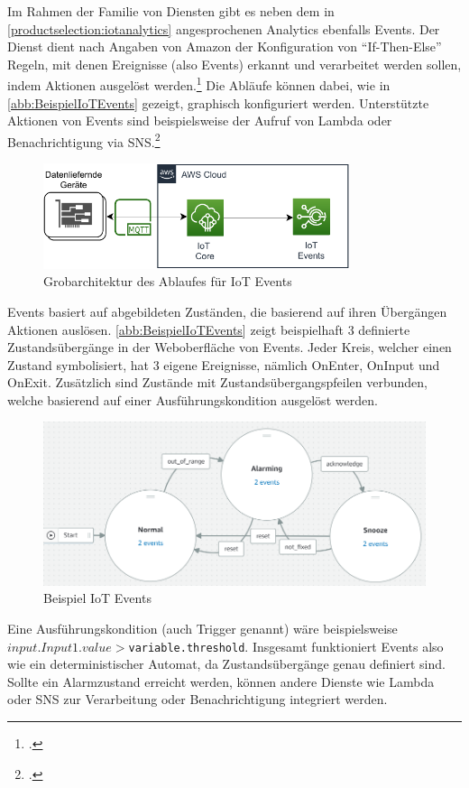 Im Rahmen der \AWSIOT{} Familie von Diensten gibt es neben dem in \autoref{productselection:iotanalytics} angesprochenen \AWSIOT{} Analytics ebenfalls \AWSIOT{} Events.  
Der Dienst dient nach Angaben von Amazon der Konfiguration von \enquote{If-Then-Else} Regeln, mit denen Ereignisse (also Events) erkannt und verarbeitet werden sollen, indem Aktionen ausgelöst werden.\footcite[Vgl.][]{AmazonWebServicesInc..o.J.b} Die Abläufe können dabei, wie in \autoref{abb:BeispielIoTEvents} gezeigt, graphisch konfiguriert werden. Unterstützte Aktionen von \AWSIOT{} Events sind beispielsweise der Aufruf von Lambda oder Benachrichtigung via \ac{SNS}.\footcite[Vgl.][]{AmazonWebServicesInc..o.J.ao}
\begin{figure}[H]
\centering
\includegraphics[width=0.8\textwidth]{graphics/IoT-Events-general.pdf}
\caption{Grobarchitektur des Ablaufes für IoT Events}
\label{abb:GrobArchitekturIoTEvents}
\end{figure}

\AWSIOT{} Events basiert auf abgebildeten Zuständen, die basierend auf ihren Übergängen Aktionen auslösen. \autoref{abb:BeispielIoTEvents} zeigt beispielhaft 3 definierte Zustandsübergänge in der Weboberfläche von \AWSIOT{} Events. Jeder Kreis, welcher einen Zustand symbolisiert, hat 3 eigene Ereignisse, nämlich OnEnter, OnInput und OnExit. Zusätzlich sind Zustände mit Zustandsübergangspfeilen verbunden, welche basierend auf einer Ausführungskondition ausgelöst werden. 
\begin{figure}[H]
\centering
\includegraphics[height=0.28\textheight]{graphics/IoT-Events-Demo.png}
\caption{Beispiel IoT Events}
\label{abb:BeispielIoTEvents}
\end{figure}
Eine Ausführungskondition (auch Trigger genannt) wäre beispielsweise \texttt{$input.Input1.value > $variable.threshold}. Insgesamt funktioniert \AWSIOT{} Events also wie ein deterministischer Automat, da Zustandsübergänge genau definiert sind.
Sollte ein Alarmzustand erreicht werden, können andere Dienste wie Lambda oder \ac{SNS} zur Verarbeitung oder Benachrichtigung integriert werden.

